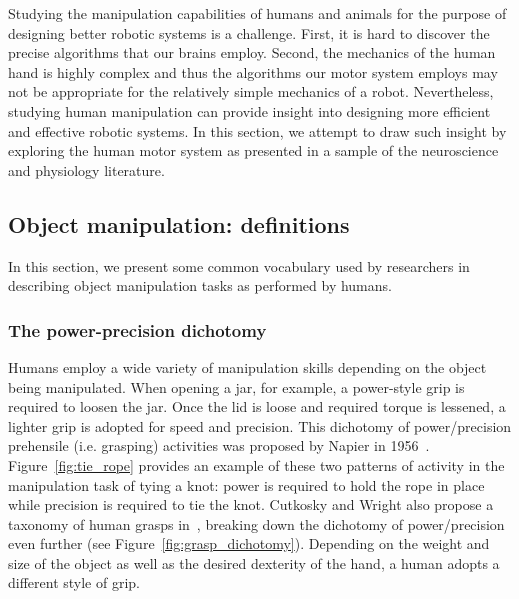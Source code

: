 Studying the manipulation capabilities of humans and animals for the purpose of designing better robotic systems is a challenge.
First, it is hard to discover the precise algorithms that our brains employ.
Second, the mechanics of the human hand is highly complex and thus the algorithms our motor system employs may not be appropriate for the relatively simple mechanics of a robot.
Nevertheless, studying human manipulation can provide insight into designing more efficient and effective robotic systems.
In this section, we attempt to draw such insight by exploring the human motor system as presented in a sample of the neuroscience and physiology literature.

\subsection{Object manipulation: definitions}

In this section, we present some common vocabulary used by researchers in describing object manipulation tasks as performed by humans.

\subsubsection*{The power-precision dichotomy}

Humans employ a wide variety of manipulation skills depending on the object being manipulated.
When opening a jar, for example, a power-style grip is required to loosen the jar.
Once the lid is loose and required torque is lessened, a lighter grip is adopted for speed and precision.
This dichotomy of power/precision prehensile (i.e. grasping) activities was proposed by Napier in 1956~\cite{napier1956prehensile}.
Figure~\ref{fig:tie_rope} provides an example of these two patterns of activity in the manipulation task of tying a knot: power is required to hold the rope in place while precision is required to tie the knot. 
Cutkosky and Wright also propose a taxonomy of human grasps in~\cite{cutkosky1989grasp}, breaking down the dichotomy of power/precision even further (see Figure~\ref{fig:grasp_dichotomy}).
Depending on the weight and size of the object as well as the desired dexterity of the hand, a human adopts a different style of grip.

